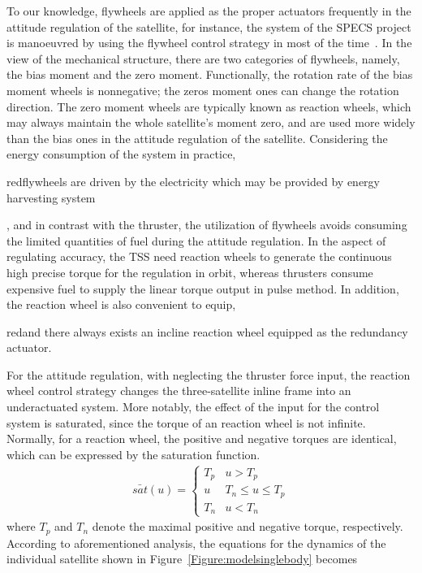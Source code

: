 To our knowledge, flywheels are applied as the proper actuators frequently in the attitude regulation of the satellite, for instance, the system of the SPECS project is manoeuvred by using the flywheel control strategy in most of the time~\cite{chung2008propellant1}. In the view of the mechanical structure, there are two categories of flywheels, namely, the bias moment and the zero moment. Functionally, the rotation rate of the bias moment wheels is nonnegative; the zeros moment ones can change the rotation direction. The zero moment wheels are typically known as reaction wheels, which may always maintain the whole satellite's moment zero, and are used more widely than the bias ones in the attitude regulation of the satellite. Considering the energy consumption of the system in practice, \begin{color}{red}flywheels are driven by the electricity which may be provided by energy harvesting system\end{color}, and in contrast with the thruster, the utilization of flywheels avoids consuming the limited quantities of fuel during the attitude regulation. In the aspect of regulating accuracy, the TSS need reaction wheels to generate the continuous high precise torque for the regulation in orbit, whereas thrusters consume expensive fuel to supply the linear torque output in pulse method. In addition, the reaction wheel is also convenient to equip, \begin{color}{red}and there always exists an incline reaction wheel equipped as the redundancy actuator.\end{color} For the attitude regulation, with neglecting the thruster force input, the reaction wheel control strategy changes the three-satellite inline frame into an underactuated system. More notably, the effect of the input for the control system is saturated, since the torque of an reaction wheel is not infinite. Normally, for a reaction wheel, the positive and negative torques are identical, which can be expressed by the saturation function.
\begin{align}
\bar{sat}(u)=
\begin{cases}
T_p &u > T_p\\
u   &T_n\le u\le T_p\\
T_n &u < T_n
\end{cases}
\end{align}
where $T_p$ and $T_n$ denote the maximal positive and negative torque, respectively. According to aforementioned analysis, the equations for the dynamics of the individual satellite shown in Figure~\ref{Figure:modelsinglebody} becomes
